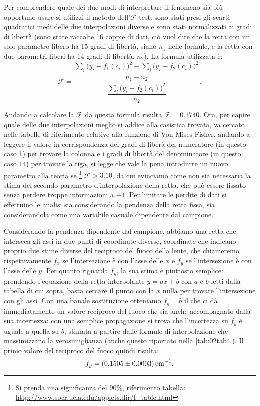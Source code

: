Per comprendere quale dei due modi di interpretare il fenomeno sia più opportuno usare si utilizzi il metodo dell'$\mathcal{F}$-test:
 sono stati presi gli scarti quadratici medi delle due interpolazioni diverse e sono stati normalizzati ai gradi di libertà
 (sono state raccolte 16 coppie di dati, ciò vuol dire che la retta con un solo parametro libero ha 15 gradi di libertà,
 siano $n_1$ nelle formule, e la retta con due parametri liberi ha 14 gradi di libertà, $n_2$).
 La formula utilizzata è:
\[\mathcal{F}=\frac{\dfrac{{\sum_i \big( y_i-f_1 (c_i) \big) ^2} - {\sum_i \big( y_i-f_2 (c_i) \big) ^2}}{n_1-n_2}}{\dfrac{\sum_i \big( y_i-f_2 
(c_i) \big) ^2}{n_2}}.\]

Andando a calcolare la $\mathcal{F}$ da questa formula risulta $\mathcal{F} = 0.1740$. Ora, per capire quale delle due interpolazioni meglio si addice alla
 casistica trovata, va cercato nelle tabelle di riferimento relative alla funzione di Von Mises-Fisher, andando a leggere il valore
 in corrispondenza dei gradi di liberà del numeratore (in questo caso 1) per trovare la colonna e i gradi di libertà del denominatore
 (in questo caso $14$) per trovare la riga, si legge che vale la pena introdurre un nuovo parametro alla teoria 
 se \footnote{Si prenda una significanza del $90\%$, riferimento tabella: \url{http://www.socr.ucla.edu/applets.dir/f_table.html}} $\mathcal{F} > 3.10$, 
 da cui evinciamo come non sia necessaria la stima del secondo parametro d'interpolazione della retta, che può essere fissato senza perdere
 troppe informazioni a $-1$. Per limitare le perdite di dati si effettuino le analisi sia considerando la pendenza della retta fissa,
 sia considerandola come una variabile casuale dipendente dal campione.

Considerando la pendenza dipendente dal campione, abbiamo una retta che interseca gli assi in due punti di coordinate diverse,
 coordinate che indicano proprio due stime diverse del reciproco del fuoco della lente, che chiameremo rispettivamente
$f_x$ se l'intersezione è con l'asse delle $x$ e $f_y$ se l'intersezione è con l'asse delle $y$.
 Per quanto riguarda $f_y$, la sua stima è piuttosto semplice: prendendo l'equazione della retta interpolante $y=ax + b$
 con $a$ e $b$ letti dalla tabella di cui sopra, basta cercare il punto con la $x$ nulla per trovare l'intersezione con gli assi.
 Con una banale sostituzione otteniamo $f_y= b$ il che ci dà immediatamente un valore reciproco del fuoco che sia anche
 accompagnato dalla sua incertezza: con una semplice propagazione si trova che l'incertezza su $f_y$ è uguale a quella su $b$,
 stimata a partire dalle formule di interpolazione che massimizzano la verosimiglianza (anche questo riportato nella 
\autoref{tab:02tab4}).
 Il primo valore del reciproco del fuoco quindi risulta:
\[f_y = (0.1505 \pm 0.0003) \,\mathrm{cm}^{-1}.\]

